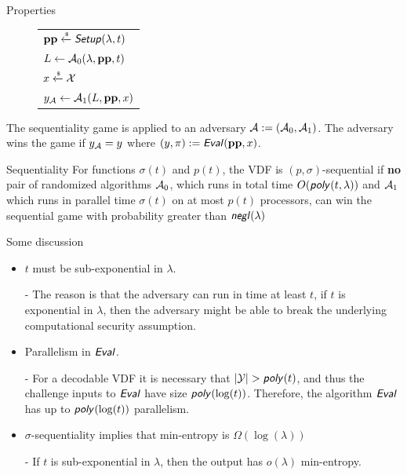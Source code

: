 \documentclass[UTF8]{beamer}
\begin{document}
	\begin{frame}{Properties}
		\begin{figure}[h]
			\centering
			\begin{tabular}{|l|}
				\hline
				$\mathbf{pp}\xleftarrow{\text{\tiny$\mathsf{\$}$}}\textsf{\textit{Setup}}(\lambda,t)$\\
				$L\gets\mathcal{A}_0(\lambda,\mathbf{pp},t)$\\
				$x\xleftarrow{\text{\tiny$\mathsf{\$}$}}\mathcal{X}$\\
				$y_{\mathcal{A}}\gets\mathcal{A}_1(L,\mathbf{pp},x)$\\
				\hline
			\end{tabular}
		\end{figure}
		\begin{block}{}
			The sequentiality game is applied to an adversary $\mathcal{A}:=(\mathcal{A}_0,\mathcal{A}_1)$. The adversary wins the game if $y_{\mathcal{A}}=y$ where $(y,\pi):=\textsf{\textit{Eval}}(\mathbf{pp},x)$.
		\end{block}
		\begin{block}{Sequentiality}
			For functions $\sigma(t)$ and $p(t)$, the VDF is $(p,\sigma)$-sequential if \textbf{no} pair of randomized algorithms $\mathcal{A}_0$, which runs in total time $O(\textsf{\textit{poly}}(t,\lambda))$ and $\mathcal{A}_1$ which runs in parallel time $\sigma(t)$ on at most $p(t)$ processors, can win the sequential game with probability greater than $\textsf{\textit{negl}}(\lambda)$
		\end{block}
	\end{frame}

	\begin{frame}{Some discussion}
		\begin{itemize}
			\item $t$ must be sub-exponential in $\lambda$.
			\item [-] The reason is that the adversary can run in time at least $t$, if $t$ is exponential in $\lambda$, then the adversary might be able to break the underlying computational security assumption.
			\item Parallelism in $\textsf{\textit{Eval}}$.
			\item [-] For a decodable VDF it is necessary that $|\cY|>\poly(t)$, and thus the challenge inputs to $\textsf{\textit{Eval}}$ have size $\textsf{\textit{poly}}(\log(t))$. Therefore, the algorithm $\textsf{\textit{Eval}}$ has up to $\textsf{\textit{poly}}(\log(t))$ parallelism.
			\item $\sigma$-sequentiality implies that min-entropy is $\Omega(\log(\lambda))$
			\item [-] If $t$ is sub-exponential in $\lambda$, then the output has $o(\lambda)$ min-entropy.
		\end{itemize}
	\end{frame}
\end{document}
